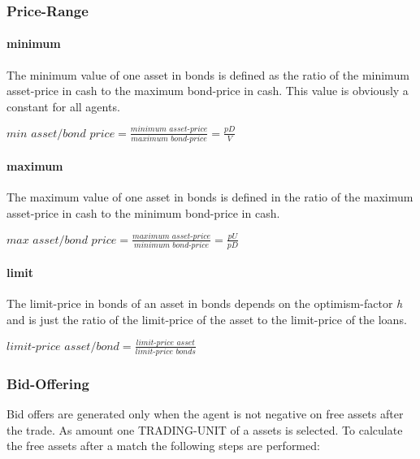 \documentclass[Bachelorarbeit.tex]{subfiles}
\begin{document}
\subsubsection{Price-Range}

\paragraph{minimum}
The minimum value of one asset in bonds is defined as the ratio of the minimum asset-price in cash to the maximum bond-price in cash. This value is obviously a constant for all agents.

\begin{center}
$\textit{min asset/bond price} = \frac{\textit{minimum asset-price}}{\textit{maximum bond-price}} = \frac{pD}{V}$
\end{center}
 
\paragraph{maximum}
The maximum value of one asset in bonds is defined in the ratio of the maximum asset-price in cash to the minimum bond-price in cash.

\begin{center}
$\textit{max asset/bond price} = \frac{\textit{maximum asset-price}}{\textit{minimum bond-price}} = \frac{pU}{pD}$
\end{center}

\paragraph{limit}
The limit-price in bonds of an asset in bonds depends on the optimism-factor \textit{h} and is just the ratio of the limit-price of the asset to the limit-price of the loans.

\begin{center}
$\textit{limit-price asset/bond} = \frac{\textit{limit-price asset}}{\textit{limit-price bonds}}$
\end{center}

\subsubsection{Bid-Offering}
Bid offers are generated only when the agent is not negative on free assets after the trade. As amount one TRADING-UNIT of a assets is selected. To calculate the free assets after a match the following steps are performed:
\end{document}
